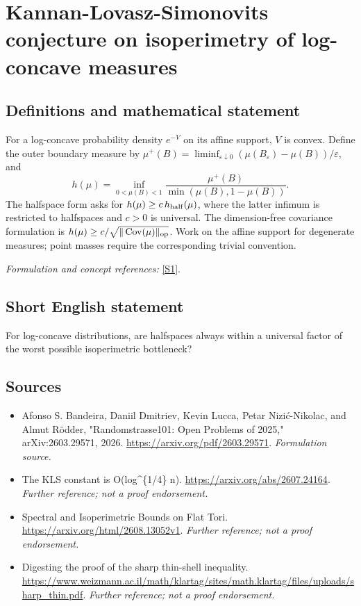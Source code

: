 \documentclass[11pt]{article}
\begin{document}
\section*{\texorpdfstring{Kannan-Lovasz-Simonovits conjecture on isoperimetry of log-concave measures}{Kannan-Lovasz-Simonovits conjecture on isoperimetry of log-concave measures}}\label{98}
\subsection{Definitions and mathematical statement}
For a log-concave probability density $e^{-V}$ on its affine support, $V$ is convex. Define the outer boundary measure by $\mu^+(B)=\liminf_{\varepsilon\downarrow0}(\mu(B_\varepsilon)-\mu(B))/\varepsilon$, and
\[
 h(\mu)=\inf_{0<\mu(B)<1}\frac{\mu^+(B)}{\min(\mu(B),1-\mu(B))}.
\]
The halfspace form asks for $h(\mu)\ge c\,h_{\rm half}(\mu)$, where the latter infimum is restricted to halfspaces and $c>0$ is universal. The dimension-free covariance formulation is $h(\mu)\ge c/\sqrt{\|\operatorname{Cov}(\mu)\|_{\rm op}}$. Work on the affine support for degenerate measures; point masses require the corresponding trivial convention.
\par\smallskip\textit{Formulation and concept references:} \href{https://arxiv.org/pdf/2603.29571}{[S1]}.

\subsection{Short English statement}
For log-concave distributions, are halfspaces always within a universal factor of the worst possible isoperimetric bottleneck?
\subsection{Sources}
\begin{itemize}
\item[S1]Afonso S. Bandeira, Daniil Dmitriev, Kevin Lucca, Petar Nizić-Nikolac, and Almut Rödder, "Randomstrasse101: Open Problems of 2025," arXiv:2603.29571, 2026.
\url{https://arxiv.org/pdf/2603.29571}.
\textit{Formulation source.}
\item[S2]The KLS constant is O(log\textasciicircum{}\{1/4\} n).
\url{https://arxiv.org/abs/2607.24164}.
\textit{Further reference; not a proof endorsement.}
\item[S3]Spectral and Isoperimetric Bounds on Flat Tori.
\url{https://arxiv.org/html/2608.13052v1}.
\textit{Further reference; not a proof endorsement.}
\item[S4]Digesting the proof of the sharp thin-shell inequality.
\url{https://www.weizmann.ac.il/math/klartag/sites/math.klartag/files/uploads/sharp_thin.pdf}.
\textit{Further reference; not a proof endorsement.}
\end{itemize}
\end{document}
